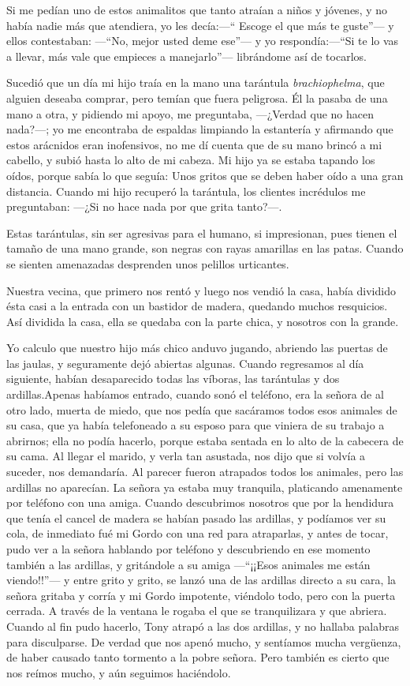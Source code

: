 \documentclass[letterpaper, 12pt]{book}
\begin{document}
Si me pedían uno de estos animalitos que tanto atraían a niños y jóvenes, y no había nadie más que atendiera, yo les decía:---`` Escoge el que más te guste''--- y ellos contestaban: ---``No, mejor usted deme ese''--- y yo respondía:---``Si te lo vas a llevar, más vale que empieces a manejarlo''--- librándome así de tocarlos.


Sucedió que un día mi hijo traía en la mano una tarántula \textit{brachiophelma}, que alguien deseaba comprar, pero temían que fuera peligrosa. Él la pasaba de una mano a otra, y pidiendo mi apoyo, me preguntaba, ---¿Verdad que no hacen nada?---; yo me encontraba de espaldas limpiando la estantería y afirmando que estos arácnidos eran inofensivos, no me dí cuenta que de su mano brincó a mi cabello, y subió hasta lo alto de mi cabeza. Mi hijo ya se estaba tapando los oídos, porque sabía lo que seguía: Unos gritos que se deben haber oído a una gran distancia. Cuando mi hijo recuperó la tarántula, los clientes incrédulos me preguntaban: ---¿Si no hace nada por que grita tanto?---.

Estas tarántulas, sin ser agresivas para el humano, si impresionan, pues tienen el tamaño de una mano grande, son negras con rayas amarillas en las patas. Cuando se sienten amenazadas desprenden unos pelillos urticantes.

Nuestra vecina, que primero nos rentó y luego nos vendió la casa, había dividido ésta casi a la entrada con un bastidor de madera, quedando muchos resquicios. Así dividida la  casa, ella se quedaba con la parte chica, y nosotros con la grande.

Yo calculo que nuestro hijo más chico anduvo jugando, abriendo las puertas de las jaulas, y seguramente dejó abiertas algunas. Cuando regresamos al día siguiente, habían desaparecido todas las víboras, las tarántulas y dos ardillas.Apenas habíamos entrado, cuando sonó el teléfono, era la señora de al otro lado, muerta de miedo, que nos pedía que sacáramos todos esos animales de su casa, que ya había telefoneado a su esposo para que viniera de su trabajo a abrirnos; ella no podía hacerlo, porque estaba sentada en lo alto de la cabecera de su cama. Al llegar el marido, y verla tan asustada, nos dijo que si volvía a suceder, nos demandaría. Al parecer fueron atrapados todos los animales, pero las ardillas no aparecían. La señora ya estaba muy tranquila, platicando amenamente  por teléfono con una amiga. Cuando descubrimos nosotros que por la hendidura que tenía el cancel de madera se habían pasado las ardillas, y podíamos ver su cola, de inmediato fué mi Gordo con una red para atraparlas, y antes de tocar, pudo ver a la señora hablando por teléfono y descubriendo en ese momento también a las ardillas, y gritándole a su amiga ---``¡¡Esos animales me están viendo!!''--- y entre grito y grito, se lanzó una de las ardillas directo a su cara, la señora gritaba y corría y mi Gordo impotente, viéndolo todo, pero con la puerta cerrada. A través de la ventana le rogaba el que se tranquilizara y que abriera. Cuando al fin pudo hacerlo, Tony atrapó a las dos ardillas, y no hallaba palabras para disculparse. De verdad que nos apenó mucho, y sentíamos mucha vergüenza, de haber causado tanto tormento a la pobre señora. Pero también  es cierto que nos reímos mucho, y aún seguimos haciéndolo.
\end{document}
